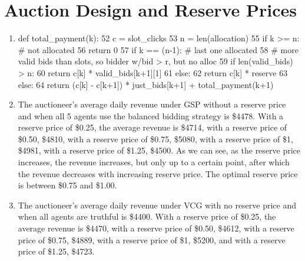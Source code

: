 \documentclass[12pt]{article}
\begin{document}
\section{Auction Design and Reserve Prices}
\begin{enumerate}[label=(\alph*)]
\item 

\begin{python}
def total_payment(k):                                                                                             
 52             c = slot_clicks                                                     
 53             n = len(allocation)                                              
 55             if k >= n: # not allocated                                          
 56                 return 0                                                        
 57             if k == (n-1): # last one allocated                                 
 58                 # more valid bids than slots, so bidder w/bid > r, but no alloc 
 59                 if len(valid_bids) > n:                                         
 60                    return c[k] * valid_bids[k+1][1]                             
 61                 else:                                                           
 62                     return c[k] * reserve                                       
 63             else:                                                               
 64                 return (c[k] - c[k+1]) * just_bids[k+1] 
                    + total_payment(k+1)   
\end{python}

\item The auctioneer's average daily revenue under GSP without a reserve price and when all 5 agents use the balanced bidding strategy is \$4478. With a reserve price of \$0.25, the average revenue is \$4714, with a reserve price of \$0.50, \$4810, with a reserve price of \$0.75, \$5080, with a reserve price of \$1, \$4981, with a reserve price of \$1.25, \$4500. 
As we can see, as the reserve price increases, the revenue increases, but only up to a certain point, after which the revenue decreases with increasing reserve price. The optimal reserve price is between \$0.75 and \$1.00. 

\item The auctioneer's average daily revenue under VCG with no reserve price and when all agents are truthful is \$4400. With a reserve price of \$0.25, the average revenue is \$4470, with a reserve price of \$0.50, \$4612, with a reserve price of \$0.75, \$4889, with a reserve price of \$1, \$5200, and with a reserve price of \$1.25, \$4723.


\end{enumerate}
\end{document}
